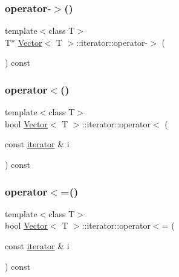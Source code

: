\subsubsection{\texorpdfstring{operator-\/$>$()}{operator->()}}
{\footnotesize\ttfamily template$<$class T$>$ \\
T$\ast$ \hyperlink{classVector}{Vector}$<$ T $>$\+::iterator\+::operator-\/$>$ (\begin{DoxyParamCaption}{ }\end{DoxyParamCaption}) const\hspace{0.3cm}{\ttfamily [inline]}}

\mbox{\label{classVector_1_1iterator_a2168ad507f6877bd555bb00094eae2a7_a2168ad507f6877bd555bb00094eae2a7}} 
\subsubsection{\texorpdfstring{operator$<$()}{operator<()}}
{\footnotesize\ttfamily template$<$class T$>$ \\
bool \hyperlink{classVector}{Vector}$<$ T $>$\+::iterator\+::operator$<$ (\begin{DoxyParamCaption}\item[{const \hyperlink{classVector_1_1iterator}{iterator} \&}]{i }\end{DoxyParamCaption}) const\hspace{0.3cm}{\ttfamily [inline]}}

\mbox{\label{classVector_1_1iterator_af74c57313919fde4c919027969233977_af74c57313919fde4c919027969233977}} 
\subsubsection{\texorpdfstring{operator$<$=()}{operator<=()}}
{\footnotesize\ttfamily template$<$class T$>$ \\
bool \hyperlink{classVector}{Vector}$<$ T $>$\+::iterator\+::operator$<$= (\begin{DoxyParamCaption}\item[{const \hyperlink{classVector_1_1iterator}{iterator} \&}]{i }\end{DoxyParamCaption}) const\hspace{0.3cm}{\ttfamily [inline]}}

